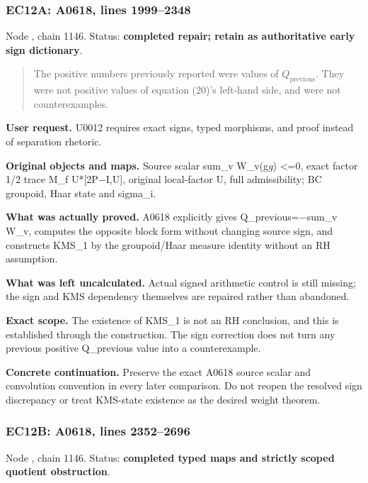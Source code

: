 \documentclass[10pt,a4paper,oneside]{report}
\begin{document}
\subsubsection{EC12A: A0618, lines
1999--2348}\label{ec12a-a0618-lines-19992348}

Node \protect{}, chain 1146.
Status: \textbf{completed repair; retain as authoritative early sign
dictionary}.

\begin{quote}
The positive numbers previously reported were values of
\(Q_{\mathrm{previous}}\). They were not positive values of equation
(20)'s left-hand side, and were not counterexamples.
\end{quote}

\textbf{User request.} U0012 requires exact signs, typed morphisms, and
proof instead of separation rhetoric.

\textbf{Original objects and maps.} Source scalar sum\_v W\_v(g\emph{g})
\textless=0, exact factor 1/2 trace M\_f
U*[2P\allowbreak{}\ensuremath{−}\allowbreak{}I,U], original local-factor
U, full admissibility; BC groupoid, Haar state and sigma\_i.

\textbf{What was actually proved.} A0618 explicitly gives
Q\_previous=\allowbreak{}\ensuremath{−}\allowbreak{}sum\_v W\_v,
computes the opposite block form without changing source sign, and
constructs KMS\_1 by the groupoid/Haar measure identity without an RH
assumption.

\textbf{What was left uncalculated.} Actual signed arithmetic control is
still missing; the sign and KMS dependency themselves are repaired
rather than abandoned.

\textbf{Exact scope.} The existence of KMS\_1 is not an RH conclusion,
and this is established through the construction. The sign correction
does not turn any previous positive Q\_previous value into a
counterexample.

\textbf{Concrete continuation.} Preserve the exact A0618 source scalar
and convolution convention in every later comparison. Do not reopen the
resolved sign discrepancy or treat KMS-state existence as the desired
weight theorem.

\subsubsection{EC12B: A0618, lines
2352--2696}\label{ec12b-a0618-lines-23522696}

Node \protect{}, chain 1146.
Status: \textbf{completed typed maps and strictly scoped quotient
obstruction}.
\end{document}
